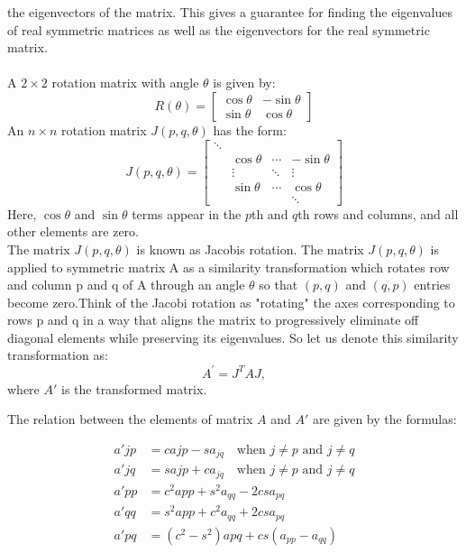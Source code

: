 \documentclass[journal]{IEEEtran}
\begin{document}
the eigenvectors of the matrix. This gives a guarantee for finding the eigenvalues of real symmetric matrices as well as the eigenvectors for the real symmetric matrix.\\\\
A $2 \times 2$ rotation matrix with angle $\theta$ is given by:
\[
R(\theta) =
\begin{bmatrix}
\cos\theta & -\sin\theta \\
\sin\theta & \cos\theta
\end{bmatrix}
\]
An $n \times n$ rotation matrix $J(p, q, \theta)$ has the form:
\[
J(p, q, \theta) = \begin{bmatrix}
\ddots & & & \\
& \cos\theta & \cdots & -\sin\theta \\
& \vdots & \ddots & \vdots \\
& \sin\theta & \cdots & \cos\theta \\
& & & \ddots
\end{bmatrix}
\]
Here, $\cos\theta$ and $\sin\theta$ terms appear in the $p$th and $q$th rows and columns, and all other elements are zero.\\

The matrix $J(p,q,\theta)$ is known as Jacobis rotation. The matrix $J(p,q,\theta)$ is applied to symmetric matrix A as a similarity transformation which rotates row and column p and q of A through an angle $\theta$ so that $(p, q)$ and $(q, p)$ entries become zero.Think of the Jacobi rotation as "rotating" the axes corresponding to rows p and  q in a way that aligns the matrix to progressively eliminate off diagonal elements while preserving its eigenvalues. So let us denote this similarity transformation as:\\
\[
A^{\prime} = J^{T} A J,
\]
where $A'$ is the transformed matrix.




The relation between the elements of matrix $A$ and $A'$ are given by the formulas:

\begin{align*}
    a'{jp} &= c a{jp} - s a_{jq} \quad \text{when } j \neq p \text{ and } j \neq q \\
    a'{jq} &= s a{jp} + c a_{jq} \quad \text{when } j \neq p \text{ and } j \neq q \\
    a'{pp} &= c^2 a{pp} + s^2 a_{qq} - 2cs a_{pq} \\
    a'{qq} &= s^2 a{pp} + c^2 a_{qq} + 2cs a_{pq} \\
    a'{pq} &= (c^2 - s^2) a{pq} + cs (a_{pp} - a_{qq})
\end{align*}
\end{document}
